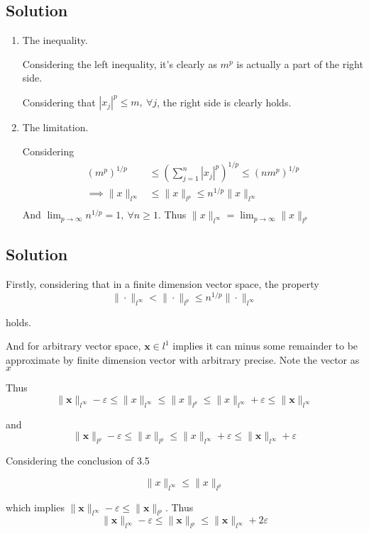 \documentclass{article}
\begin{document}
\subsection{Solution}
\begin{enumerate}
    \item The inequality.
    
    Considering the left inequality, it's clearly as \(m^p\) is actually a part of the right side. 

    Considering that \(|x_j|^p \le m,\ \forall j\), the right side is clearly holds.

    \item The limitation.
    
    Considering
    \begin{align*}
        {(m^p)}^{1/p} &\le (\sum_{j = 1}^n |x_j|^p)^{1/p} \le {(nm^p)}^{1/p} \\
        \implies \|x\|_{l^\infty} &\le \|x\|_{l^p} \le n^{1/p}\|x\|_{l^\infty}\\
    \end{align*}
    And \(\lim_{p \to \infty} n^{1/p} = 1,\ \forall n \ge 1\). Thus 
    \(\|x\|_{l^\infty} = \lim_{p \to \infty}\|x\|_{l^p}\)
\end{enumerate}

\subsection{Solution}
Firstly, considering that in a finite dimension vector space, the property
\[\|\cdot\|_{l^\infty} < \|\cdot\|_{l^p} \le n^{1/p}\|\cdot\|_{l^\infty}\]

holds.

And for arbitrary vector space, \(\mathbf{x} \in {l}^1\) implies it can minus some remainder to be approximate by finite dimension vector with arbitrary precise. Note the vector as \(x\)

Thus
\[\|\mathbf{x}\|_{l^\infty} - \varepsilon \le \|x\|_{l^\infty} \le \|x\|_{l^p} \le \|x\|_{l^\infty} + \varepsilon \le \|\mathbf x\|_{l^\infty} \]

and 
\[\|\mathbf{x}\|_{l^p} - \varepsilon \le \|x\|_{l^p} \le \|x\|_{l^\infty} + \varepsilon \le \|\mathbf x\|_{l^\infty} + \varepsilon\]

Considering the conclusion of 3.5

\[\|x\|_{l^\infty} \le \|x\|_{l^p}\]

which implies \(\|\mathbf x\|_{l^\infty} - \varepsilon \le \|\mathbf x\|_{l^p}\). Thus 
\[\|\mathbf x\|_{l^\infty} - \varepsilon \le \|\mathbf x\|_{l^p} \le \|\mathbf x\|_{l^\infty} + 2\varepsilon\]
\end{document}
